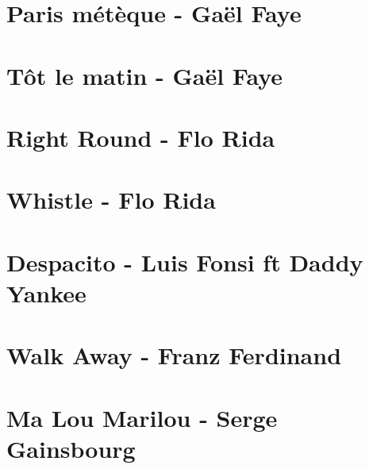 \documentclass[11pt]{article}
\begin{document}
\section{Paris métèque - Gaël Faye}
\begin{guitar}

\end{guitar}


\section{Tôt le matin - Gaël Faye}
\begin{guitar}

\end{guitar}

\section{Right Round - Flo Rida}
\begin{guitar}

\end{guitar}


\section{Whistle - Flo Rida}
\begin{guitar}

\end{guitar}

\section{Despacito - Luis Fonsi ft Daddy Yankee}





\section{Walk Away - Franz Ferdinand}
\begin{guitar}

\end{guitar}


\section{Ma Lou Marilou - Serge Gainsbourg}
\begin{guitar}

\end{guitar}
\end{document}
